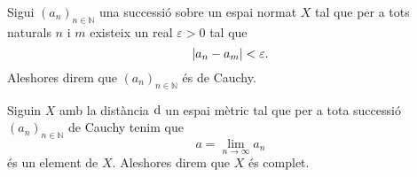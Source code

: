\documentclass[../Apunts.tex]{subfiles}
\begin{document}
	\begin{definition}
		\label{def:successió de Cauchy amb normes}
		Sigui \((a_{n})_{n\in\mathbb{N}}\) una successió sobre un espai normat \(X\) tal que per a tots naturals \(n\) i \(m\) existeix un real \(\varepsilon>0\) tal que
		\[\norm{a_{n}-a_{m}}<\varepsilon.\]
		Aleshores direm que \((a_{n})_{n\in\mathbb{N}}\) és de Cauchy.
	\end{definition}
	\begin{definition}
		\label{def:espai mètric complet}
		Siguin \(X\) amb la distància \(\operatorname{d}\) un espai mètric tal que per a tota successió \((a_{n})_{n\in\mathbb{N}}\) de Cauchy tenim que
		\[a=\lim_{n\to\infty}a_{n}\]
		és un element de \(X\). Aleshores direm que \(X\) és complet.
	\end{definition}
\end{document}
